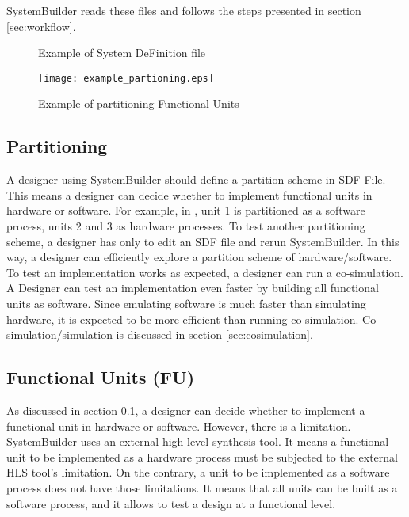SystemBuilder reads these files and follows the steps presented in section \ref{sec:workflow}.

\begin{figure}[tbp] %
  \centering
  
  \caption{Example of System DeFinition file}
  \label{fig:eg_sdf}
\end{figure}

\begin{figure}[tb]
\centering
\texttt{[image: example\_partioning.eps]}
\caption{Example of partitioning Functional Units}
\label{fig:example}
\end{figure}

\subsection{Partitioning}\label{sec:partitioning}
A designer using SystemBuilder should define a partition scheme in SDF File.
This means a designer can decide whether to implement functional units in hardware or software. For example, in , unit 1 is partitioned as a software process, units 2 and 3 as hardware processes.
To test another partitioning scheme, a designer has only to edit an SDF file and rerun SystemBuilder. In this way, a designer can efficiently explore a partition scheme of hardware/software. To test an implementation works as expected, a designer can run a co-simulation.
A Designer can test an implementation even faster by building all functional units as software. Since emulating software is much faster than simulating hardware, it is expected to be more efficient than running co-simulation. Co-simulation/simulation is discussed in section \ref{sec:cosimulation}.

\subsection{Functional Units (FU)}
As discussed in section \ref{sec:partitioning}, a designer can decide whether to implement a functional unit in hardware or software. However, there is a limitation. SystemBuilder uses an external high-level synthesis tool.
It means a functional unit to be implemented as a hardware process must be subjected to the external HLS tool's limitation.
On the contrary, a unit to be implemented as a software process does not have those limitations. It means that all units can be built as a software process, and it allows to test a design at a functional level.

